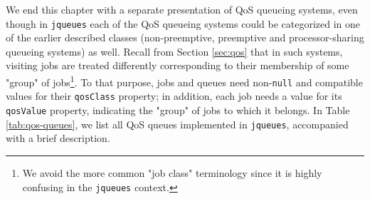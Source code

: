 We end this chapter with a separate presentation of
  QoS queueing systems,
  even though in \lstinline|jqueues|
  each of the QoS queueing systems
  could be categorized in one of the earlier
  described classes (non-preemptive, preemptive
  and processor-sharing queueing systems)
  as well.
Recall from Section \ref{sec:qos}
  that in such systems,
  visiting jobs are treated differently
  corresponding to their membership of
  some "group" of jobs\footnote{
    We avoid the more common "job class" terminology
    since it is highly confusing in the \lstinline|jqueues|
    context.}.
To that purpose,
  jobs and queues need
  non-\lstinline|null| and compatible
  values for their \lstinline|qosClass|
  property;
  in addition,
  each job needs a value
  for its \lstinline|qosValue|
  property, indicating the "group"
  of jobs to which it belongs.
In Table \ref{tab:qos-queues},
  we list all QoS queues implemented in
  \lstinline|jqueues|, accompanied with a brief
  description.
  
